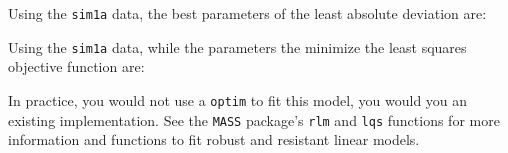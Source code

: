 \documentclass[]{book}
\newenvironment{Shaded}{\begin{snugshade}}{\end{snugshade}}
\newcommand{\CommentTok}[1]{\textcolor[rgb]{0.56,0.35,0.01}{\textit{#1}}}
\newcommand{\ControlFlowTok}[1]{\textcolor[rgb]{0.13,0.29,0.53}{\textbf{#1}}}
\newcommand{\DataTypeTok}[1]{\textcolor[rgb]{0.13,0.29,0.53}{#1}}
\newcommand{\DecValTok}[1]{\textcolor[rgb]{0.00,0.00,0.81}{#1}}
\newcommand{\KeywordTok}[1]{\textcolor[rgb]{0.13,0.29,0.53}{\textbf{#1}}}
\newcommand{\NormalTok}[1]{#1}
\newcommand{\OperatorTok}[1]{\textcolor[rgb]{0.81,0.36,0.00}{\textbf{#1}}}
\newcommand{\StringTok}[1]{\textcolor[rgb]{0.31,0.60,0.02}{#1}}
\theoremstyle{plain}
\theoremstyle{remark}
\theoremstyle{definition}
\theoremstyle{definition}
\theoremstyle{definition}
\theoremstyle{remark}
\begin{document}
\begin{Shaded}
\end{Shaded}

Using the \texttt{sim1a} data, the best parameters of the least absolute
deviation are:

\begin{Shaded}
\end{Shaded}

Using the \texttt{sim1a} data, while the parameters the minimize the
least squares objective function are:

\begin{Shaded}
\end{Shaded}

In practice, you would not use a \texttt{optim} to fit this model, you
would you an existing implementation. See the \texttt{MASS} package's
\texttt{rlm} and \texttt{lqs} functions for more information and
functions to fit robust and resistant linear models.
\end{document}
